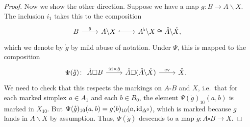 \documentclass[main.tex]{subfiles}
\begin{document}
\begin{proof}
  Now we show the other direction. Suppose we have a map $g\colon B \to A \backslash X$. The inclusion $i_{1}$ takes this to the composition
  \begin{equation*}
    \begin{tikzcd}
      B
      \arrow[r, "g"]
      & A \backslash X
      \arrow[r, hook]
      & A\flt \backslash X \cong \mathring{A} \backslash \mathring{X},
    \end{tikzcd}
  \end{equation*}
  which we denote by $\mathring{g}$ by mild abuse of notation. Under $\Psi$, this is mapped to the composition
  \begin{equation*}
    \Psi(\mathring{g})\colon
    \begin{tikzcd}
      \mathring{A} \square B
      \arrow[r, "\id \times \mathring{g}"]
      & \mathring{A} \square (\mathring{A} \backslash \mathring{X})
      \arrow[r, "\ev"]
      & \mathring{X}.
    \end{tikzcd}
  \end{equation*}
  We need to check that this respects the markings on $A \square B$ and $X$, i.e.\ that for each marked simplex $a \in A_{1}$ and each $b \in B_{0}$, the element $\Psi(\mathring{g})_{10}(a, b)$ is marked in $X_{10}$. But $\Psi(\mathring{g})_{10}(a, b) = g(b)_{10}(a, \mathrm{id}_{\Delta^{0}})$, which is marked because $g$ lands in $A \backslash X$ by assumption. Thus, $\Psi(\mathring{g})$ descends to a map $\tilde{g}\colon A \square B \to X$.


\end{proof}
\end{document}
